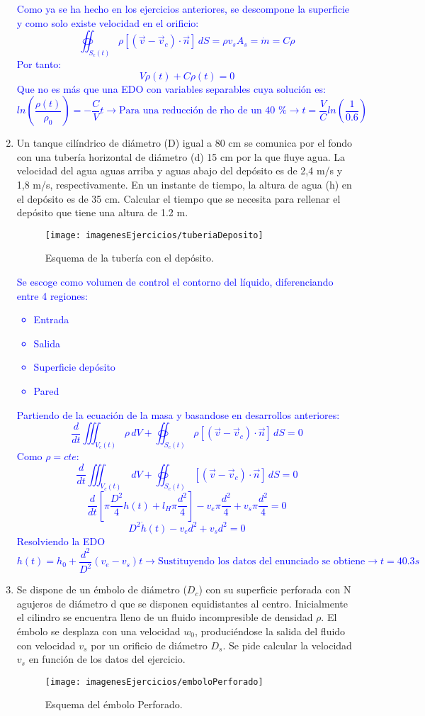 \begin{enumerate}
	\textcolor{blue}{Como ya se ha hecho en los ejercicios anteriores, se descompone la superficie y como solo existe velocidad en el orificio:
	\[\oiint_{S_c(t)} \rho\left[(\vec{v}-\vec{v}_c)\cdot\vec{n}\right] \,dS=\rho v_s A_s = \dot{m}=C\rho\]	
	Por tanto:
	\[V \dot{\rho}(t)+C\rho(t)=0\]
	Que no es más que una EDO con variables separables cuya solución es:
	\[ln\left(\dfrac{\rho(t)}{\rho _0}\right)=-\dfrac{C}{V}t \rightarrow \text{Para una reducción de rho de un 40 \%} \rightarrow t=\dfrac{V}{C}ln\left(\dfrac{1}{0.6}\right)\]}
	\newpage
	\item Un tanque cilíndrico de diámetro (D) igual a 80 cm se comunica por el fondo con una
	tubería horizontal de diámetro (d) 15 cm por la que fluye agua. La
	velocidad del agua aguas arriba y aguas abajo del depósito es de 2,4 m/s y 1,8 m/s,
	respectivamente. En un instante de tiempo, la altura de agua (h) en el depósito es de 35
	cm. Calcular el tiempo que se necesita para rellenar el depósito que tiene una altura de
	1.2 m.
	\begin{figure}[H] 
		\centering
		\texttt{[image: imagenesEjercicios/tuberiaDeposito]}
		\caption{Esquema de la tubería con el depósito.}
		\label{fig:tuberiadeposito}
	\end{figure}
	\textcolor{blue}{
	Se escoge como volumen de control el contorno del líquido, diferenciando entre 4 regiones:
	\begin{itemize}
		\item Entrada
		\item Salida
		\item Superficie depósito
		\item Pared
	\end{itemize}
	Partiendo de la ecuación de la masa y basandose en desarrollos anteriores:
	\[\dfrac{d}{dt}\iiint_{V_c(t)}\rho\,dV+\oiint_{S_c(t)} \rho\left[(\vec{v}-\vec{v}_c)\cdot\vec{n}\right] \,dS=0\]
	Como $\rho= cte$:
	\[\dfrac{d}{dt}\iiint_{V_c(t)}\,dV+\oiint_{S_c(t)} \left[(\vec{v}-\vec{v}_c)\cdot\vec{n}\right] \,dS=0\]
	\[\dfrac{d}{dt}\left[\pi \dfrac{D^2}{4}h(t)+l_{H}\pi\dfrac{d^2}{4}\right]-v_e\pi\dfrac{d^2}{4}+v_s\pi\dfrac{d^2}{4}=0\]
	\[D^2\dot{h}(t)-v_e d^2+v_s d^2=0\]
	Resolviendo la EDO
	\[h(t)=h_0+\dfrac{d^2}{D^2}\left(v_e-v_s\right) t\rightarrow \text{Sustituyendo los datos del enunciado se obtiene} \rightarrow t=40.3s\]
	}
	\newpage
	\item Se dispone de un émbolo de diámetro ($D_c$) con su superficie perforada con N agujeros de
	diámetro d que se disponen equidistantes al centro. Inicialmente el cilindro
	se encuentra lleno de un fluido incompresible de densidad $\rho$. El émbolo se desplaza con
	una velocidad $w_0$, produciéndose la salida del fluido con velocidad $v_s$ por un orificio de
	diámetro $D_s$. Se pide calcular la velocidad $v_s$ en función de los datos del ejercicio.
	\begin{figure}[H] 
		\centering
		\texttt{[image: imagenesEjercicios/emboloPerforado]}
		\caption{Esquema del émbolo Perforado.}
		\label{fig:emboloperforado}


\end{figure}
\end{enumerate}
